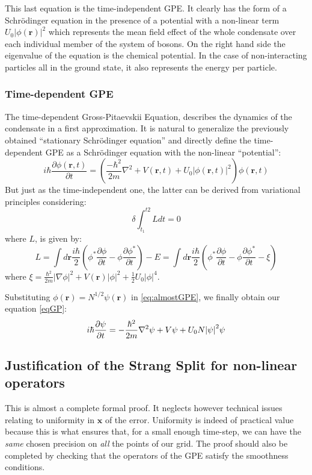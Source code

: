 \documentclass{article}
\begin{document}
This last equation is the time-independent GPE. It clearly has the form of a Schrödinger equation in the presence of a potential with a non-linear term $U_0|\phi(\mathbf{r})|^2$ which represents the mean field effect of the whole condensate over each individual member of the system of bosons. On the right hand side the eigenvalue of the equation is the chemical potential. In the case of non-interacting particles all in the ground state, it also represents the energy per particle.

\subsubsection*{Time-dependent GPE}
The time-dependent Gross-Pitaevskii Equation, describes the dynamics of the condensate in a first approximation. It is natural to generalize the previously obtained ``stationary Schrödinger equation'' and directly define the time-dependent GPE as a Schrödinger equation with the non-linear ``potential'': 
\begin{equation}\label{eq:almostGPE}
  i\hbar \frac{\partial \phi(\mathbf{r},t)}{\partial t}=\left(\frac{-\hbar^2}{2m}\nabla^2 +V(\mathbf{r},t) +U_0 |\phi(\mathbf{r},t)|^2 \right)\phi(\mathbf{r},t)  
\end{equation}
But just as the time-independent one, the latter can be derived from variational principles considering:
$$
 \delta \int_{t_1}^{t2}Ldt=0
$$
where $L$, is given by:
$$
  L=\int d\mathbf{r}\frac{i\hbar}{2}\left(\phi^*\frac{\partial \phi}{\partial t}-\phi \frac{\partial \phi^*}{\partial t}\right)-E =\int d\mathbf{r}\frac{i\hbar}{2}\left(\phi^*\frac{\partial \phi}{\partial t}-\phi \frac{\partial \phi^*}{\partial t}-\xi\right)
$$
where $\xi=\frac{\hbar^2}{2m}|\nabla\phi|^2+V(\mathbf{r})|\phi|^2+\frac{1}{2}U_0|\phi|^4$.

\bigskip \noindent
Substituting $\phi(\mathbf{r})=N^{1/2}\psi(\mathbf{r})$ in \eqref{eq:almostGPE}, we finally obtain our equation \eqref{eqGP}:
$$
i\hbar \pdv{\psi}{t} = -\frac{\hbar^2}{2m} \laplacian \psi + V \psi + U_0 N \abs{\psi}^2 \psi
$$

\newpage

\subsection*{Justification of the Strang Split for non-linear operators}

This is almost a complete formal proof. It neglects however technical issues relating to uniformity in $\mathbf{x}$ of the error. Uniformity is indeed of practical value because this is what ensures that, for a small enough time-step, we can have the \textit{same} chosen precision on \textit{all} the points of our grid. The proof should also be completed by checking that the operators of the GPE satisfy the smoothness conditions.
\end{document}

